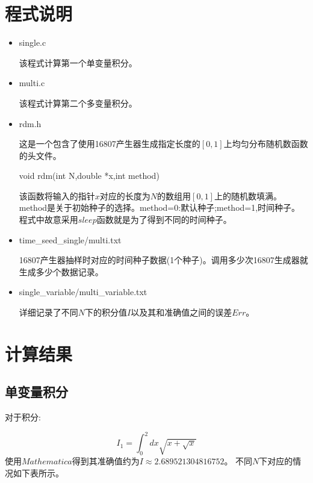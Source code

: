 \documentclass[UTF8]{ctexart}
\begin{document}
	\section{程式说明}
	\begin{itemize}
		\item single.c
		
		该程式计算第一个单变量积分。
		
		\item multi.c
		
		该程式计算第二个多变量积分。
		
		\item rdm.h
			
		这是一个包含了使用16807产生器生成指定长度的$[0,1]$上均匀分布随机数函数的头文件。
		
		\subitem void rdm(int N,double *x,int method)
		
		该函数将输入的指针$x$对应的长度为$N$的数组用$[0,1]$上的随机数填满。method是关于初始种子的选择。method=0:默认种子;method=1,时间种子。程式中故意采用$sleep$函数就是为了得到不同的时间种子。
		
		\item time\_seed\_single/multi.txt
		
		16807产生器抽样时对应的时间种子数据(1个种子)。调用多少次16807生成器就生成多少个数据记录。
		
		\item single\_variable/multi\_variable.txt
		
		详细记录了不同$N$下的积分值$I$以及其和准确值之间的误差$Err$。
	\end{itemize}
	
	\section{计算结果}
	
	\subsection{单变量积分}
	
	\begin{flushleft}
		对于积分:
	\end{flushleft}
	 $$I_1=\int_{0}^{2}dx\sqrt{x+\sqrt{x}}$$
	使用$Mathematica$得到其准确值约为$I\approx2.689521304816752$。
	不同$N$下对应的情况如下表所示。
\end{document}
